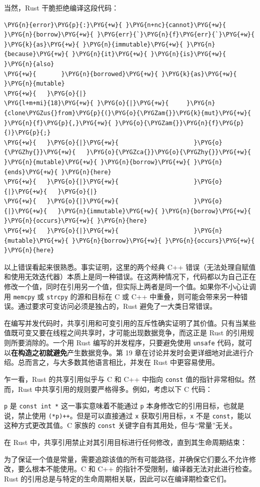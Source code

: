 当然，Rust 干脆拒绝编译这段代码：

\begin{Verbatim}[commandchars=\\\{\},breaklines=true,breakanywhere=true,fontsize=\codefont,xleftmargin=17bp]
\PYG{n}{error}\PYG{p}{:}\PYG{+w}{ }\PYG{n+nc}{cannot}\PYG{+w}{ }\PYG{n}{borrow}\PYG{+w}{ }\PYG{err}{`}\PYG{n}{f}\PYG{err}{`}\PYG{+w}{ }\PYG{k}{as}\PYG{+w}{ }\PYG{n}{immutable}\PYG{+w}{ }\PYG{n}{because}\PYG{+w}{ }\PYG{n}{it}\PYG{+w}{ }\PYG{n}{is}\PYG{+w}{ }\PYG{n}{also}
\PYG{+w}{       }\PYG{n}{borrowed}\PYG{+w}{ }\PYG{k}{as}\PYG{+w}{ }\PYG{n}{mutable}
\PYG{+w}{   }\PYG{o}{|}
\PYG{l+m+mi}{18}\PYG{+w}{ }\PYG{o}{|}\PYG{+w}{     }\PYG{n}{clone\PYGZus{}from}\PYG{p}{(}\PYG{o}{\PYGZam{}}\PYG{k}{mut}\PYG{+w}{ }\PYG{n}{f}\PYG{p}{,}\PYG{+w}{ }\PYG{o}{\PYGZam{}}\PYG{n}{f}\PYG{p}{)}\PYG{p}{;}
\PYG{+w}{   }\PYG{o}{|}\PYG{+w}{                     }\PYG{o}{\PYGZhy{}}\PYG{+w}{   }\PYG{o}{\PYGZca{}}\PYG{o}{\PYGZhy{}}\PYG{+w}{ }\PYG{n}{mutable}\PYG{+w}{ }\PYG{n}{borrow}\PYG{+w}{ }\PYG{n}{ends}\PYG{+w}{ }\PYG{n}{here}
\PYG{+w}{   }\PYG{o}{|}\PYG{+w}{                     }\PYG{o}{|}\PYG{+w}{   }\PYG{o}{|}
\PYG{+w}{   }\PYG{o}{|}\PYG{+w}{                     }\PYG{o}{|}\PYG{+w}{   }\PYG{n}{immutable}\PYG{+w}{ }\PYG{n}{borrow}\PYG{+w}{ }\PYG{n}{occurs}\PYG{+w}{ }\PYG{n}{here}
\PYG{+w}{   }\PYG{o}{|}\PYG{+w}{                     }\PYG{n}{mutable}\PYG{+w}{ }\PYG{n}{borrow}\PYG{+w}{ }\PYG{n}{occurs}\PYG{+w}{ }\PYG{n}{here}
\end{Verbatim}

以上错误看起来很熟悉。事实证明，这里的两个经典 C++ 错误（无法处理自赋值和使用无效迭代器）本质上是同一种错误。在这两种情况下，代码都以为自己正在修改一个值，同时在引用另一个值，但实际上两者是同一个值。如果你不小心让调用 \texttt{memcpy} 或 \texttt{strcpy} 的源和目标在 C 或 C++ 中重叠，则可能会带来另一种错误。通过要求可变访问必须是独占的，Rust 避免了一大类日常错误。

在编写并发代码时，共享引用和可变引用的互斥性确实证明了其价值。只有当某些值既可变又要在线程之间共享时，才可能出现数据竞争，而这正是 Rust 的引用规则所要消除的。一个用 Rust 编写的并发程序，只要避免使用 \texttt{unsafe} 代码，就可以\textbf{在构造之初就避免}产生数据竞争。第 19 章在讨论并发时会更详细地对此进行介绍。总而言之，与大多数其他语言相比，并发在 Rust 中更容易使用。

\begin{myNote}
乍一看，Rust 的共享引用似乎与 C 和 C++ 中指向 \texttt{const} 值的指针非常相似。然而，Rust 中共享引用的规则要严格得多。例如，考虑以下 C 代码：

\texttt{p} 是 \texttt{const int *} 这一事实意味着不能通过 \texttt{p} 本身修改它的引用目标，也就是说，禁止使用 \texttt{(*p)++}。但是可以直接通过 \texttt{x} 获取引用目标，\texttt{x} 不是 \texttt{const}，能以这种方式更改其值。C 家族的 \texttt{const} 关键字自有其用处，但与“常量”无关。

在 Rust 中，共享引用禁止对其引用目标进行任何修改，直到其生命周期结束：

为了保证一个值是常量，需要追踪该值的所有可能路径，并确保它们要么不允许修改，要么根本不能使用。C 和 C++ 的指针不受限制，编译器无法对此进行检查。Rust 的引用总是与特定的生命周期相关联，因此可以在编译期检查它们。
\end{myNote}

